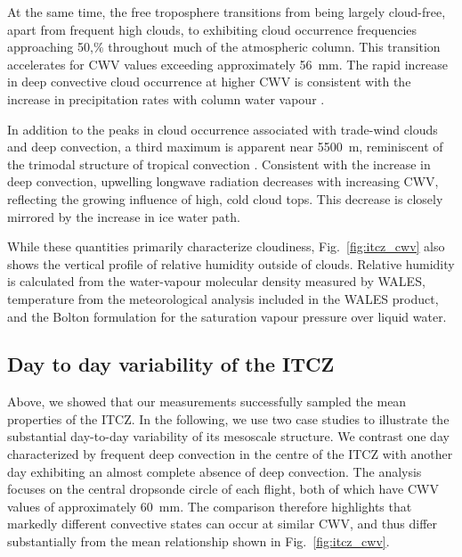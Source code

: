 \documentclass{article}
\begin{document}
At the same time, the free troposphere transitions from being largely cloud-free, apart from frequent high clouds, to exhibiting cloud occurrence frequencies approaching 50,$\%$ throughout much of the atmospheric column. This transition accelerates for CWV values exceeding approximately \SI{56}{\milli\meter}. The rapid increase in deep convective cloud occurrence at higher CWV is consistent with the increase in precipitation rates with column water vapour \cite[e.g.][]{Bretherton2004, Peters2006}.

In addition to the peaks in cloud occurrence associated with trade-wind clouds and deep convection, a third maximum is apparent near \SI{5500}{\meter}, reminiscent of the trimodal structure of tropical convection \cite{johnsonTrimodalCharacteristicsTropical1999}. Consistent with the increase in deep convection, upwelling longwave radiation decreases with increasing CWV, reflecting the growing influence of high, cold cloud tops. This decrease is closely mirrored by the increase in ice water path.

While these quantities primarily characterize cloudiness, Fig.~\ref{fig:itcz_cwv} also shows the vertical profile of relative humidity outside of clouds. Relative humidity is calculated from the water-vapour molecular density measured by WALES, temperature from the meteorological analysis included in the WALES product, and the Bolton formulation for the saturation vapour pressure over liquid water.

  



\subsection{Day to day variability of the ITCZ}


Above, we showed that our measurements successfully sampled the mean properties of the ITCZ. In the following, we use two case studies to illustrate the substantial day-to-day variability of its mesoscale structure. We contrast one day characterized by frequent deep convection in the centre of the ITCZ with another day exhibiting an almost complete absence of deep convection. The analysis focuses on the central dropsonde circle of each flight, both of which have CWV values of approximately \SI{60}{\milli\meter}. The comparison therefore highlights that markedly different convective states can occur at similar CWV, and thus differ substantially from the mean relationship shown in Fig.~\ref{fig:itcz_cwv}.
\end{document}
